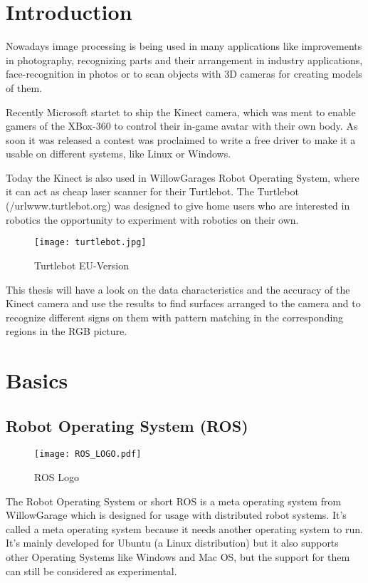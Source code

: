 \chapter{Introduction}
\graphicspath{{./Introduction/img/}}

Nowadays image processing is being used in many applications like improvements in
photography, recognizing parts and their arrangement in industry applications, 
face-recognition in photos or to scan objects with 3D cameras for creating
models of them.

Recently Microsoft startet to ship the Kinect camera, which was ment to enable
gamers of the XBox-360 to control their in-game avatar with their own body.
As soon it was released a contest was proclaimed to write a free driver to make it a
usable on different systems, like Linux or Windows.

Today the Kinect is also used in WillowGarages Robot Operating System,
where it can act as cheap laser scanner for their Turtlebot. The Turtlebot 
(/url{www.turtlebot.org}) was designed to give home users who are interested in 
robotics the opportunity to experiment with robotics on their own.

\begin{figure}[htp]
\begin{center}
  \texttt{[image: turtlebot.jpg]}
  \caption{Turtlebot EU-Version}
  \label{figure:turtlebot}
\end{center}
\end{figure}

This thesis will have a look on the data characteristics and the accuracy of the
Kinect camera and use the results to find surfaces arranged to the camera and to 
recognize different signs on them with pattern matching in the corresponding regions
in the RGB picture.

\chapter{Basics}

\section{Robot Operating System (ROS)}
  
\begin{figure}[htp]
	\centering
	\texttt{[image: ROS\_LOGO.pdf]}
	\caption{ROS Logo}
\end{figure} 

The Robot Operating System or short ROS is a meta operating system from WillowGarage which is designed for usage with distributed 
robot systems. It's called a meta operating system because it needs another operating system to run. It's mainly developed for Ubuntu 
(a Linux distribution) but it also supports other Operating Systems like Windows and Mac OS, but the support for them can still be considered 
as experimental. 

